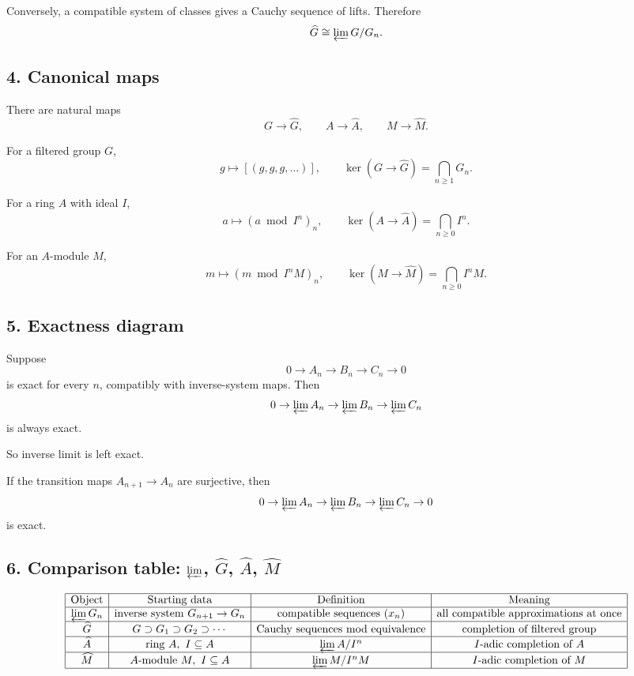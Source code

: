 \documentclass[12pt,a4paper]{article}
\theoremstyle{plain}
\theoremstyle{definition}      %
\begin{document}
Conversely, a compatible system of classes gives a Cauchy sequence of lifts. Therefore
\[
\widehat G \cong \varprojlim G/G_n.
\]

\subsection*{4. Canonical maps}

There are natural maps
\[
G\to \widehat G,\qquad
A\to \widehat A,\qquad
M\to \widehat M.
\]

For a filtered group \(G\),
\[
g\longmapsto [(g,g,g,\dots)],
\qquad
\ker(G\to \widehat G)=\bigcap_{n\ge1} G_n.
\]

For a ring \(A\) with ideal \(I\),
\[
a\longmapsto (a \bmod I^n)_n,
\qquad
\ker(A\to \widehat A)=\bigcap_{n\ge0} I^n.
\]

For an \(A\)-module \(M\),
\[
m\longmapsto (m \bmod I^nM)_n,
\qquad
\ker(M\to \widehat M)=\bigcap_{n\ge0} I^nM.
\]

\subsection*{5. Exactness diagram}

Suppose
\[
0\to A_n\to B_n\to C_n\to 0
\]
is exact for every \(n\), compatibly with inverse-system maps. Then
\[
0\to \varprojlim A_n \to \varprojlim B_n \to \varprojlim C_n
\]
is always exact.

So inverse limit is left exact.

If the transition maps \(A_{n+1}\to A_n\) are surjective, then
\[
0\to \varprojlim A_n \to \varprojlim B_n \to \varprojlim C_n \to 0
\]
is exact.

\subsection*{6. Comparison table: \(\varprojlim\), \(\widehat G\), \(\widehat A\), \(\widehat M\)}

\[
\begin{array}{|c|c|c|c|}
	\hline
	\text{Object} & \text{Starting data} & \text{Definition} & \text{Meaning} \\
	\hline
	\varprojlim G_n
	& \text{inverse system }G_{n+1}\to G_n
	& \text{compatible sequences }(x_n)
	& \text{all compatible approximations at once} \\
	\hline
	\widehat G
	& G\supset G_1\supset G_2\supset\cdots
	& \text{Cauchy sequences mod equivalence}
	& \text{completion of filtered group} \\
	\hline
	\widehat A
	& \text{ring }A,\ I\subseteq A
	& \varprojlim A/I^n
	& I\text{-adic completion of }A \\
	\hline
	\widehat M
	& A\text{-module }M,\ I\subseteq A
	& \varprojlim M/I^nM
	& I\text{-adic completion of }M \\
	\hline
\end{array}
\]
\end{document}
